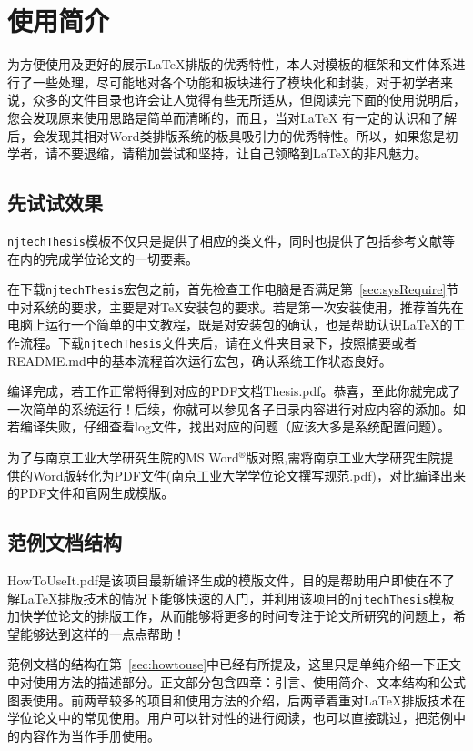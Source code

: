 
\chapter{使用简介}
\label{chap:guide}

为方便使用及更好的展示\LaTeX{}排版的优秀特性，本人对模板的框架和文件体系进行了一些处理，尽可能地对各个功能和板块进行了模块化和封装，对于初学者来说，众多的文件目录也许会让人觉得有些无所适从，但阅读完下面的使用说明后，您会发现原来使用思路是简单而清晰的，而且，当对\LaTeX{} 有一定的认识和了解后，会发现其相对Word类排版系统的极具吸引力的优秀特性。所以，如果您是初学者，请不要退缩，请稍加尝试和坚持，让自己领略到\LaTeX{}的非凡魅力。

\section{先试试效果}

\texttt{njtechThesis}模板不仅只是提供了相应的类文件，同时也提供了包括参考文献等在内的完成学位论文的一切要素。

在下载\texttt{njtechThesis}宏包之前，首先检查工作电脑是否满足第~\ref{sec:sysRequire}节中对系统的要求，主要是对\TeX{}安装包的要求。若是第一次安装使用，推荐首先在电脑上运行一个简单的中文教程，既是对安装包的确认，也是帮助认识\LaTeX{}的工作流程。下载\texttt{njtechThesis}文件夹后，请在文件夹目录下，按照摘要或者README.md中的基本流程首次运行宏包，确认系统工作状态良好。

编译完成，若工作正常将得到对应的PDF文档Thesis.pdf。恭喜，至此你就完成了一次简单的系统运行！后续，你就可以参见各子目录内容进行对应内容的添加。如若编译失败，仔细查看log文件，找出对应的问题（应该大多是系统配置问题）。

为了与南京工业大学研究生院的MS Word$^{\circledR}$版对照,需将南京工业大学研究生院提供的Word版转化为PDF文件(南京工业大学学位论文撰写规范.pdf)，对比编译出来的PDF文件和官网生成模版。

\section{范例文档结构}
\label{sec:example}

HowToUseIt.pdf是该项目最新编译生成的模版文件，目的是帮助用户即使在不了解\LaTeX{}排版技术的情况下能够快速的入门，并利用该项目的\texttt{njtechThesis}模板加快学位论文的排版工作，从而能够将更多的时间专注于论文所研究的问题上，希望能够达到这样的一点点帮助！

范例文档的结构在第~\ref{sec:howtouse}中已经有所提及，这里只是单纯介绍一下正文中对使用方法的描述部分。正文部分包含四章：引言、使用简介、文本结构和公式图表使用。前两章较多的项目和使用方法的介绍，后两章着重对\LaTeX{}排版技术在学位论文中的常见使用。用户可以针对性的进行阅读，也可以直接跳过，把范例中的内容作为当作手册使用。




